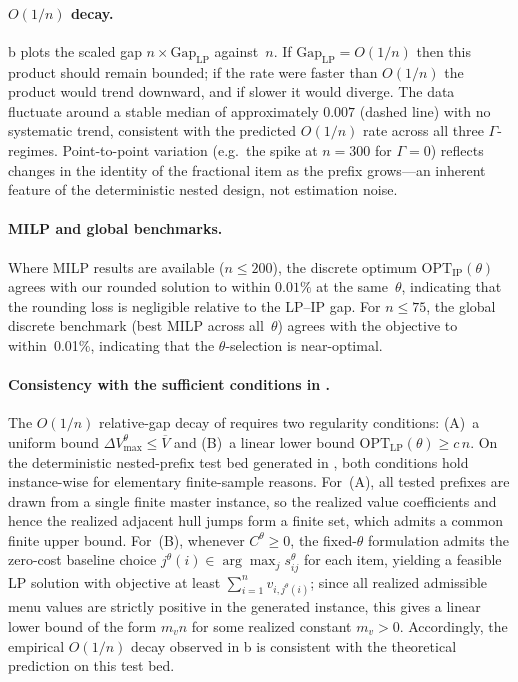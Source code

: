 \documentclass[11pt, a4paper]{article}
\theoremstyle{plain}
\theoremstyle{definition}
\theoremstyle{remark}
\begin{document}
\paragraph{\(O(1/n)\) decay.}
b plots the scaled gap
$n\times\mathrm{Gap}_{\mathrm{LP}}$ against~$n$. If
$\mathrm{Gap}_{\mathrm{LP}}=O(1/n)$ then this product should remain bounded; if the rate were
faster than \(O(1/n)\) the product would trend downward, and if slower it would diverge.
The data fluctuate around a stable median of approximately $0.007$ (dashed line) with no
systematic trend, consistent with the predicted \(O(1/n)\) rate across all three
$\Gamma$-regimes. Point-to-point variation (e.g.\ the spike at $n=300$ for $\Gamma=0$) reflects
changes in the identity of the fractional item as the prefix grows---an inherent feature of the
deterministic nested design, not estimation noise.

\paragraph{MILP and global benchmarks.}
Where MILP results are available ($n\le 200$), the discrete optimum
$\mathrm{OPT}_{\mathrm{IP}}(\theta)$ agrees with our rounded solution to within $0.01\%$ at
the same~$\theta$, indicating that the rounding loss is negligible relative to the LP--IP gap.
For $n\le 75$, the global discrete benchmark (best MILP across all~$\theta$) agrees with the
 objective to within~0.01\%, indicating that the
$\theta$-selection is near-optimal.

\paragraph{Consistency with the sufficient conditions in .}
The \(O(1/n)\) relative-gap decay of  requires two regularity conditions: (A)~a uniform bound $\Delta V_{\max}^{\theta} \leq \overline V$ and (B)~a linear lower bound $\mathrm{OPT}_{\mathrm{LP}}(\theta) \geq c\,n$. On the deterministic nested-prefix test bed generated in , both conditions hold instance-wise for elementary finite-sample reasons. For~(A), all tested prefixes are drawn from a single finite master instance, so the realized value coefficients and hence the realized adjacent hull jumps form a finite set, which admits a common finite upper bound. For~(B), whenever $C^\theta\ge 0$, the fixed-$\theta$ formulation admits the zero-cost baseline choice $j^\theta(i)\in\arg\max_j s^\theta_{ij}$ for each item, yielding a feasible LP solution with objective at least $\sum_{i=1}^n v_{i,j^\theta(i)}$; since all realized admissible menu values are strictly positive in the generated instance, this gives a linear lower bound of the form $m_v n$ for some realized constant $m_v>0$. Accordingly, the empirical \(O(1/n)\) decay observed in b is consistent with the theoretical prediction on this test bed.
\end{document}
